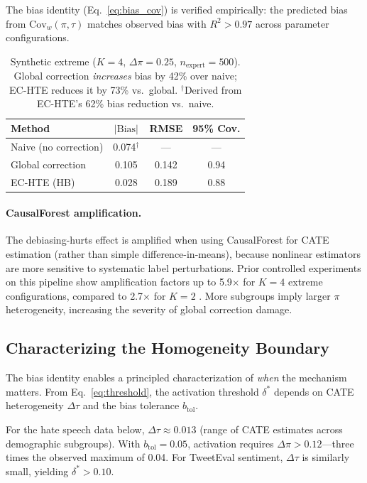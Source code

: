 \documentclass[11pt,a4paper]{article}
\newcommand{\Cov}{\mathrm{Cov}}
\begin{document}
The bias identity (Eq.~\ref{eq:bias_cov}) is verified empirically: the predicted bias from $\Cov_w(\pi,\tau)$ matches observed bias with $R^2 > 0.97$ across parameter configurations.

\begin{table}[t]
\centering
\small
\begin{tabular}{@{}lccc@{}}
\toprule
\textbf{Method} & \textbf{$|\text{Bias}|$} & \textbf{RMSE} & \textbf{95\% Cov.} \\
\midrule
Naive (no correction) & 0.074$^\dagger$ & --- & --- \\
Global correction & 0.105 & 0.142 & 0.94 \\
EC-HTE (HB) & 0.028 & 0.189 & 0.88 \\
\bottomrule
\end{tabular}
\caption{Synthetic extreme ($K=4$, $\Delta\pi=0.25$, $n_{\text{expert}}=500$). Global correction \emph{increases} bias by 42\% over naive; EC-HTE reduces it by 73\% vs.\ global. $^\dagger$Derived from EC-HTE's 62\% bias reduction vs.\ naive.}
\label{tab:synthetic_main}
\end{table}

\paragraph{CausalForest amplification.}
The debiasing-hurts effect is amplified when using CausalForest for CATE estimation (rather than simple difference-in-means), because nonlinear estimators are more sensitive to systematic label perturbations.
Prior controlled experiments on this pipeline show amplification factors up to 5.9$\times$ for $K=4$ extreme configurations, compared to 2.7$\times$ for $K=2$ \cite[cf.][]{wager2018estimation}.
More subgroups imply larger $\pi$ heterogeneity, increasing the severity of global correction damage.

\subsection{Characterizing the Homogeneity Boundary}
\label{sec:boundary}

The bias identity enables a principled characterization of \emph{when} the mechanism matters.
From Eq.~\eqref{eq:threshold}, the activation threshold $\delta^*$ depends on CATE heterogeneity $\Delta\tau$ and the bias tolerance $b_{\text{tol}}$.

For the hate speech data below, $\Delta\tau \approx 0.013$ (range of CATE estimates across demographic subgroups).
With $b_{\text{tol}} = 0.05$, activation requires $\Delta\pi > 0.12$---three times the observed maximum of 0.04.
For TweetEval sentiment, $\Delta\tau$ is similarly small, yielding $\delta^* > 0.10$.
\end{document}
